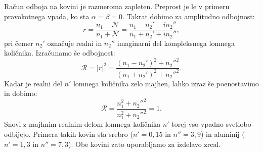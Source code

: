 Račun odboja na kovini je razmeroma zapleten. Preprost je le v primeru pravokotnega vpada, 
ko sta $\alpha = \beta = 0$. Takrat dobimo za amplitudno odbojnost:
\begin{equation}
r = \frac{n_1 - \mathcal{N}}{n_1 + \mathcal{N}} = \frac{n_1 -n_2' -in_2''}{n_1 +n_2' +in_2''},
\label{eq:04_101}
\end{equation}
pri čemer $n_2'$ označuje realni in $n_2''$ imaginarni del kompleksnega lomnega količnika.
Izračunamo še odbojnost:
\begin{equation}
\mathcal{R} = |r|^2 = \frac{(n_1 -n_2')^2 +n_2''^2}{(n_1 +n_2')^2 +n_2''^2}.
\label{eq:04_102}
\end{equation}
Kadar je realni del $n'$ lomnega količnika zelo majhen, lahko izraz še poenostavimo 
in dobimo:
\begin{equation}
\mathcal{R} = \frac{n_1^2 +n_2''^2}{n_1^2 +n_2''^2} = 1.
\label{eq:04_103}
\end{equation}
Snovi z majhnim realnim delom lomnega količnika $n'$ torej vso vpadno 
svetlobo odbijejo. Primera takih kovin sta srebro ($n'=0,15$ in $n''=3,9$)
in aluminij ($n'=1,3$ in $n''=7,3$). Obe kovini zato uporabljamo za izdelavo
zrcal.
